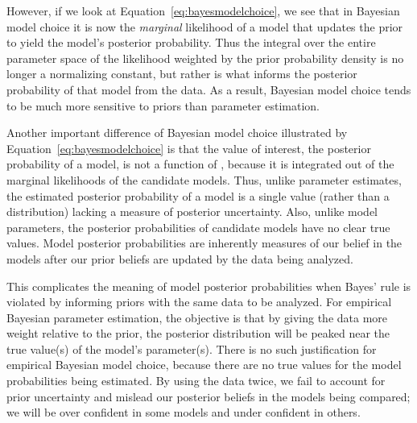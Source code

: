 
However, if we look at Equation~\ref{eq:bayesmodelchoice}, we see that in
Bayesian model choice it is now the \emph{marginal} likelihood of a model that
updates the prior to yield the model's posterior probability.
Thus the integral over the entire parameter space of the likelihood weighted by
the prior probability density is no longer a normalizing constant, but rather
is what informs the posterior probability of that model from the data.
As a result, Bayesian model choice tends to be much more sensitive to priors
than parameter estimation.

Another important difference of Bayesian model choice illustrated by
Equation~\ref{eq:bayesmodelchoice} is that the value of interest, the
posterior probability of a model, is not a function of \myTheta{}, because
it is integrated out of the marginal likelihoods of the candidate models.
Thus, unlike parameter estimates, the estimated posterior probability of a
model is a single value (rather than a distribution) lacking a measure of
posterior uncertainty.
Also, unlike model parameters, the posterior probabilities of candidate
models have no clear true values.
Model posterior probabilities are inherently measures of our belief in the
models after our prior beliefs are updated by the data being analyzed.

This complicates the meaning of model posterior probabilities when Bayes' rule
is violated by informing priors with the same data to be analyzed.
For empirical Bayesian parameter estimation, the objective is that by giving the
data more weight relative to the prior, the posterior distribution will be
peaked near the true value(s) of the model's parameter(s).
There is no such justification for empirical Bayesian model choice, because
there are no true values for the model probabilities being estimated.
By using the data twice, we fail to account for prior uncertainty and mislead
our posterior beliefs in the models being compared; we will be over confident
in some models and under confident in others.

